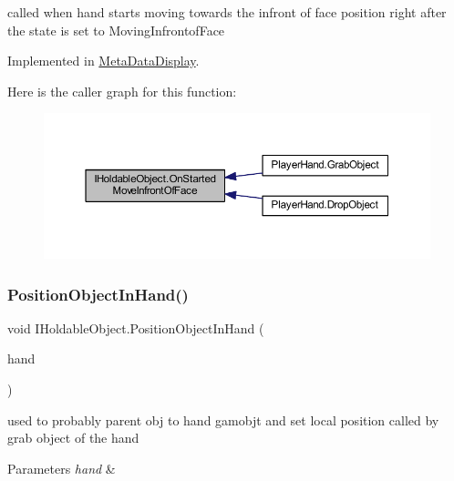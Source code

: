 called when hand starts moving towards the infront of face position right after the state is set to Moving\+Infrontof\+Face 



Implemented in \mbox{\hyperlink{class_meta_data_display_aa0a9b9ca8243943104c82602e69a0541}{Meta\+Data\+Display}}.

Here is the caller graph for this function\+:\nopagebreak
\begin{figure}[H]
\begin{center}
\leavevmode
\includegraphics[width=350pt]{interface_i_holdable_object_af5dcdd5524539104706dadd8a0e15e08_icgraph}
\end{center}
\end{figure}
\mbox{\label{interface_i_holdable_object_a3fe2e7a7d0740225142053583f438333}} 
\subsubsection{\texorpdfstring{Position\+Object\+In\+Hand()}{PositionObjectInHand()}}
{\footnotesize\ttfamily void I\+Holdable\+Object.\+Position\+Object\+In\+Hand (\begin{DoxyParamCaption}\item[{\mbox{\hyperlink{class_player_hand}{Player\+Hand}}}]{hand }\end{DoxyParamCaption})}



used to probably parent obj to hand gamobjt and set local position called by grab object of the hand 


\begin{DoxyParams}{Parameters}
{\em hand} & \\
\hline
\end{DoxyParams}


